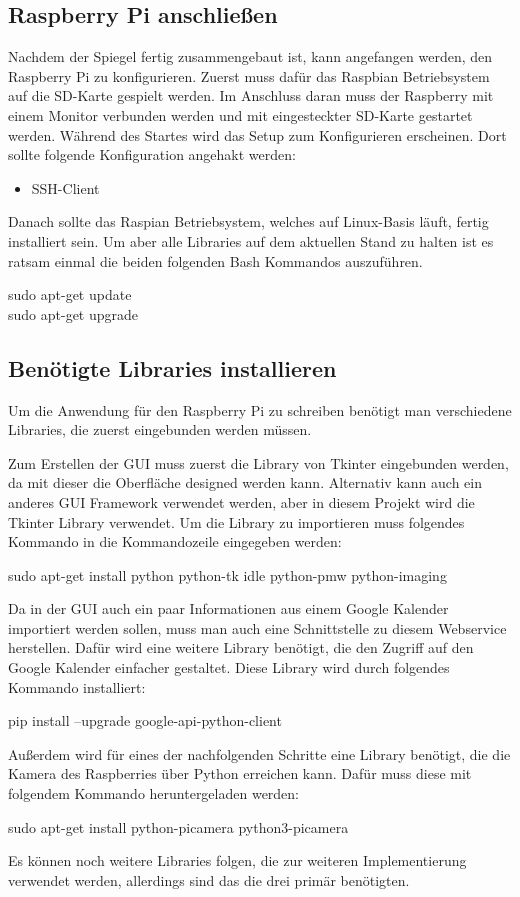 \documentclass[11pt,a4paper]{article}
\begin{document}
\subsection{Raspberry Pi anschließen}
Nachdem der Spiegel fertig zusammengebaut ist, kann angefangen werden, den Raspberry Pi zu konfigurieren. Zuerst muss dafür das Raspbian Betriebsystem auf die SD-Karte gespielt werden. Im Anschluss daran muss der Raspberry mit einem Monitor verbunden werden und mit eingesteckter SD-Karte gestartet werden. Während des Startes wird das Setup zum Konfigurieren erscheinen. Dort sollte folgende Konfiguration angehakt werden:
\begin{itemize}
  \item SSH-Client
\end{itemize}
Danach sollte das Raspian Betriebsystem, welches auf Linux-Basis läuft, fertig installiert sein. Um aber alle Libraries auf dem aktuellen Stand zu halten ist es ratsam einmal die beiden folgenden Bash Kommandos auszuführen.
\newline
\begin{center}
  sudo apt-get update\\
  sudo apt-get upgrade
\end{center}

\subsection{Benötigte Libraries installieren}
Um die Anwendung für den Raspberry Pi zu schreiben benötigt man verschiedene Libraries, die zuerst eingebunden werden müssen. 
\par
Zum Erstellen der GUI muss zuerst die Library von Tkinter eingebunden werden, da mit dieser die Oberfläche designed werden kann. Alternativ kann auch ein anderes GUI Framework verwendet werden, aber in diesem Projekt wird die Tkinter Library verwendet. Um die Library zu importieren muss folgendes Kommando in die Kommandozeile eingegeben werden:
\begin{center}
  sudo apt-get install python python-tk idle python-pmw python-imaging
\end{center}
\par
Da in der GUI auch ein paar Informationen aus einem Google Kalender importiert werden sollen, muss man auch eine Schnittstelle zu diesem Webservice herstellen. Dafür wird eine weitere Library benötigt, die den Zugriff auf den Google Kalender einfacher gestaltet. Diese Library wird durch folgendes Kommando installiert:
\begin{center}
  pip install --upgrade google-api-python-client
\end{center}
\par
Außerdem wird für eines der nachfolgenden Schritte eine Library benötigt, die die Kamera des Raspberries über Python erreichen kann. Dafür muss diese mit folgendem Kommando heruntergeladen werden:
\begin{center}
  sudo apt-get install python-picamera python3-picamera
\end{center}
Es können noch weitere Libraries folgen, die zur weiteren Implementierung verwendet werden, allerdings sind das die drei primär benötigten. 
\end{document}
